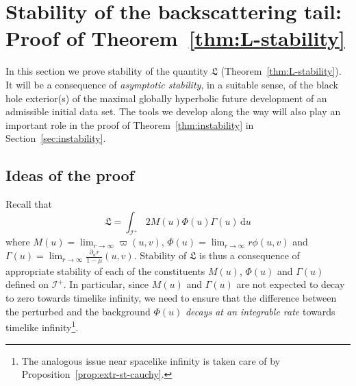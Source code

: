\documentclass[10pt, reqno]{amsart}
\theoremstyle{definition}
\theoremstyle{remark}
\theoremstyle{conjecture}
\numberwithin{equation}{section}
\newcommand{\ud}{\mathrm{d}}
\newcommand{\rd}{\partial}
\newcommand{\0}{\emptyset}
\newcommand{\Gmm}{\Gamma}
\newcommand{\calI}{\mathcal I}
\newcommand{\NI}{\calI^{+}}						%
\begin{document}
\section{Stability of the backscattering tail: Proof of Theorem~\ref{thm:L-stability}} \label{sec:L-stability}
In this section we prove stability of the quantity $\mathfrak{L}$ (Theorem~\ref{thm:L-stability}).
It will be a consequence of \emph{asymptotic stability}, in a suitable sense, of the black hole exterior(s) of the maximal globally hyperbolic future development of an admissible initial data set. The tools we develop along the way will also play an important role in the proof of Theorem~\ref{thm:instability} in Section~\ref{sec:instability}.


\subsection{Ideas of the proof}

Recall that
\begin{equation*}
	\mathfrak{L} = \int_{\NI} 2 M(u) \Phi(u) \Gmm(u) \, \ud u
\end{equation*}
where $M(u) = \lim_{r \to \infty} \varpi(u, v)$, $\Phi(u) = \lim_{r \to \infty} r \phi(u, v)$ and $\Gmm(u) = \lim_{r \to \infty} \frac{\rd_{u} r}{1-\mu}(u, v)$. Stability of $\mathfrak{L}$ is thus a consequence of appropriate stability of each of the constituents $M(u)$, $\Phi(u)$ and $\Gmm(u)$ defined on $\NI$. In particular, since $M(u)$ and $\Gmm(u)$ are not expected to decay to zero towards timelike infinity, we need to ensure that the difference between the perturbed and the background $\Phi(u)$ \emph{decays at an integrable rate} towards timelike infinity\footnote{The analogous issue near spacelike infinity is taken care of by Proposition~\ref{prop:extr-st-cauchy}.}. 
\end{document}
